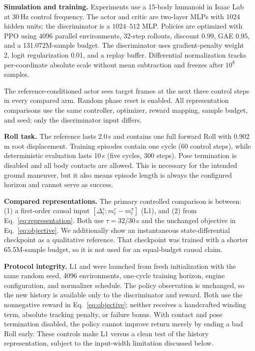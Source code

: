 \textbf{Simulation and training.}
Experiments use a 15-body humanoid in Isaac Lab \cite{mittal2023orbit} at
30\,Hz control frequency.  The actor and critic are two-layer MLPs with 1024
hidden units; the discriminator is a $1024$--$512$ MLP.  Policies are optimized
with PPO \cite{schulman2017ppo} using 4096 parallel environments, 32-step
rollouts, discount $0.99$, GAE $0.95$, and a 131.072M-sample budget.  The
discriminator uses gradient-penalty weight 2, logit regularization 0.01, and a
replay buffer.  Differential normalization tracks per-coordinate absolute
scale without mean subtraction and freezes after $10^8$ samples.

The reference-conditioned actor sees target frames at the next three control
steps in every compared arm.  Random phase reset is enabled.  All
representation comparisons use the same controller, optimizer, reward
mapping, sample budget, and seed; only the discriminator input differs.

\textbf{Roll task.}
The reference lasts 2.0\,s and contains one full forward Roll with 0.902\,m
root displacement.  Training episodes contain one cycle (60 control steps),
while deterministic evaluation lasts 10\,s (five cycles, 300 steps).  Pose
termination is disabled and all body contacts are allowed.  This is necessary
for the intended ground maneuver, but it also means episode length is always
the configured horizon and cannot serve as success.

\textbf{Compared representations.}
The primary controlled comparison is between: (1) a first-order causal input
$[\Delta_t^s;m_t^r-m_t^\pi]$ (L1), and (2) \ours{} from
Eq.~\eqref{eq:representation}.  Both use $\tau=32/30$\,s and the unchanged
objective in Eq.~\eqref{eq:objective}.  We additionally show an instantaneous
state-differential checkpoint as a qualitative reference.  That checkpoint
was trained with a shorter 65.5M-sample budget, so it is not used for an
equal-budget causal claim.

\textbf{Protocol integrity.}
L1 and \method{} were launched from fresh initialization with the same random
seed, 4096 environments, one-cycle training horizon, engine configuration, and
normalizer schedule.  The policy observation is unchanged, so the new history
is available only to the discriminator and reward.  Both use the nonnegative
reward in Eq.~\eqref{eq:objective}; neither receives a handcrafted
winding term, absolute tracking penalty, or failure bonus.  With contact and
pose termination disabled, the policy cannot improve return merely by ending a
bad Roll early.  These controls make L1 versus \method{} a clean test of the
history representation, subject to the input-width limitation discussed
below.

